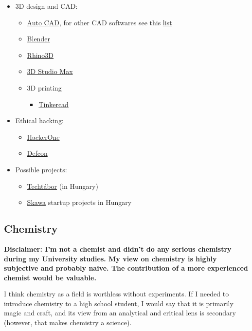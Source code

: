 \documentclass{article}
\begin{document}
\begin{itemize}
    \item 3D design and CAD:
    \begin{itemize}
        \item \href{https://en.wikipedia.org/wiki/AutoCAD}{Auto CAD}, for other CAD softwares see this \href{https://all3dp.com/1/best-cad-software/}{list}
        \item \href{https://www.blender.org/}{Blender}
        \item \href{https://www.rhino3d.com/}{Rhino3D}
        \item \href{https://en.wikipedia.org/wiki/Autodesk_3ds_Max}{3D Studio Max}
        \item 3D printing
        \begin{itemize}
            \item \href{https://en.wikipedia.org/wiki/Tinkercad}{Tinkercad}
        \end{itemize}
    \end{itemize}
    
    \item Ethical hacking:
    \begin{itemize}
        \item \href{https://www.hackerone.com/}{HackerOne}
        \item \href{https://defcon.org/}{Defcon}
    \end{itemize}

    \item Possible projects:
    \begin{itemize}
        \item \href{https://techtabor.agondolkodasorome.hu/}{Techtábor} (in Hungary)
        \item \href{https://www.skawa.hu/}{Skawa} startup projects in Hungary
    \end{itemize}
\end{itemize}

\subsection{Chemistry}

\textbf{Disclaimer: I'm not a chemist and didn't do any serious chemistry during my University studies. My view on chemistry is highly subjective and probably naive. The contribution of a more experienced chemist would be valuable.}

I think chemistry as a field is worthless without experiments. If I needed to introduce chemistry to a high school student, I would say that it is primarily magic and craft, and its view from an analytical and critical lens is secondary (however, that makes chemistry a science).
\end{document}

